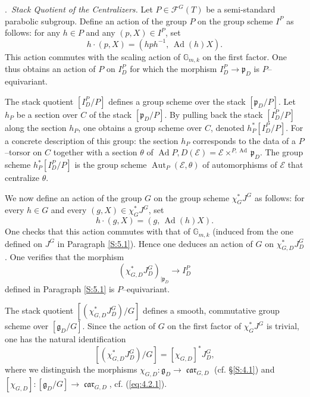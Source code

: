 \documentclass[12pt,a4paper,oneside,english,leqno]{smfart}
\makeatletter
\numberwithin{equation}{subsection}
\numberwithin{theo}{subsection}
\newenvironment{paragr}[1][]{\medskip\refstepcounter{subsection}%
  \par\noindent\hspace*{\parindent}\thesubsection.\ \emph{#1}%
  \@ifundefined{@empty}{}{}\ignorespaces}{\medskip}
\theoremstyle{plain}
\theoremstyle{definition}
\theoremstyle{remark}
\DeclareMathOperator{\Ad}{Ad}
\DeclareMathOperator{\Aut}{Aut}
\DeclareMathOperator{\car}{\mathfrak{car}}
\newcommand{\Gmk}{\mathbb{G}_{m,k}}
\newcommand{\ec}{\mathcal{E}}
\newcommand{\fc}{\mathcal{F}}
\newcommand{\ggo}{\mathfrak{g}}
\newcommand{\pgo}{\mathfrak{p}}
\makeatother
\begin{document}
\begin{paragr}[Stack Quotient of the Centralizers.]\label{S:5.4}
Let $P\in \fc^G(T)$ be a semi-standard parabolic subgroup. Define an action of the group $P$ on the group scheme $I^P$ as follows: for any $h\in P$ and any $(p,X)\in I^P$, set
$$h\cdot(p,X)= (hph^{-1},\, \Ad(h)X).$$
This action commutes with the scaling action of $\Gmk$ on the first factor. One thus obtains an action of $P$ on $I^P_D$ for which the morphism $I^P_D \to \pgo_D$ is $P$–equivariant.

The stack quotient $[I^P_D/P]$ defines a group scheme over the stack $[\pgo_D/P]$. Let $h_P$ be a section over $C$ of the stack $[\pgo_D/P]$. By pulling back the stack $[I^P_D/P]$ along the section $h_P$, one obtains a group scheme over $C$, denoted $h_P^*[I^P_D/P]$. For a concrete description of this group: the section $h_P$ corresponds to the data of a $P$–torsor on $C$ together with a section $\theta$ of $\Ad{P,D}(\ec)=\ec\times^{P,\Ad}\pgo_D$. The group scheme $h_P^*[I^P_D/P]$ is the group scheme $\Aut_P(\ec,\theta)$ of automorphisms of $\ec$ that centralize $\theta$.

We now define an action of the group $G$ on the group scheme $\chi_G^* J^G$ as follows: for every $h\in G$ and every $(g,X)\in \chi_G^* J^G$, set
$$h\cdot(g,X)= (g,\, \Ad(h)X).$$
One checks that this action commutes with that of $\Gmk$ (induced from the one defined on $J^G$ in Paragraph \ref{S:5.1}). Hence one deduces an action of $G$ on $\chi_{G,D}^* J^G_D$. One verifies that the morphism
$$(\chi_{G,D}^* J^G_D)_{|\pgo_D} \to I^P_D$$
defined in Paragraph \ref{S:5.1} is $P$–equivariant.

The stack quotient $[(\chi_{G,D}^* J^G_D)/G]$ defines a smooth, commutative group scheme over $[\ggo_D/G]$. Since the action of $G$ on the first factor of $\chi_G^* J^G$ is trivial, one has the natural identification
\begin{equation}\label{eq:5.4.1}
  [(\chi_{G,D}^* J^G_D)/G]=[\chi_{G,D}]^*J_D^G,
\end{equation}
where we distinguish the morphisms $\chi_{G,D} : \ggo_D \to \car_{G,D}$ (cf. §\ref{S:4.1}) and $[\chi_{G,D}] : [\ggo_D/G] \to \car_{G,D}$, cf. (\ref{eq:4.2.1}).
\end{paragr}
\end{document}
